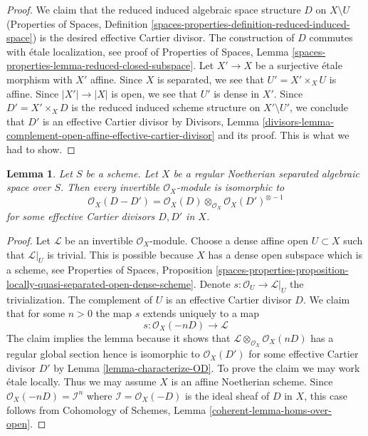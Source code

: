 \documentclass{stacks-project}
\theoremstyle{plain}
\newtheorem{lemma}[subsection]{Lemma}
\theoremstyle{definition}
\theoremstyle{remark}
\numberwithin{equation}{subsection}
\begin{document}
\begin{proof}
We claim that the reduced induced algebraic space structure $D$
on $X \setminus U$ (Properties of Spaces, Definition
\ref{spaces-properties-definition-reduced-induced-space})
is the desired effective Cartier divisor. The construction
of $D$ commutes with \'etale localization, see proof of
Properties of Spaces, Lemma
\ref{spaces-properties-lemma-reduced-closed-subspace}.
Let $X' \to X$ be a surjective \'etale morphism with $X'$ affine.
Since $X$ is separated, we see that $U' = X' \times_X U$ is
affine. Since $|X'| \to |X|$ is open, we see that $U'$
is dense in $X'$. Since $D' = X' \times_X D$ is the reduced induced
scheme structure on $X' \setminus U'$, we conclude that
$D'$ is an effective Cartier divisor by
Divisors, Lemma
\ref{divisors-lemma-complement-open-affine-effective-cartier-divisor}
and its proof. This is what we had to show.
\end{proof}

\begin{lemma}
\label{lemma-Noetherian-regular-separated-pic-effective-Cartier}
Let $S$ be a scheme. Let $X$ be a regular Noetherian separated algebraic space
over $S$. Then every invertible $\mathcal{O}_X$-module is isomorphic to
$$
\mathcal{O}_X(D - D') =
\mathcal{O}_X(D) \otimes_{\mathcal{O}_X} \mathcal{O}_X(D')^{\otimes -1}
$$
for some effective Cartier divisors $D, D'$ in $X$.
\end{lemma}

\begin{proof}
Let $\mathcal{L}$ be an invertible $\mathcal{O}_X$-module.
Choose a dense affine open $U \subset X$ such that
$\mathcal{L}|_U$ is trivial. This is possible because
$X$ has a dense open subspace which is a scheme, see
Properties of Spaces, Proposition
\ref{spaces-properties-proposition-locally-quasi-separated-open-dense-scheme}.
Denote $s : \mathcal{O}_U \to \mathcal{L}|_U$ the trivialization.
The complement of $U$ is an effective Cartier divisor
$D$. We claim that for some $n > 0$ the map $s$ extends uniquely to a map
$$
s : \mathcal{O}_X(-nD) \longrightarrow \mathcal{L}
$$
The claim implies the lemma because it shows that
$\mathcal{L} \otimes_{\mathcal{O}_X} \mathcal{O}_X(nD)$
has a regular global section hence is isomorphic to
$\mathcal{O}_X(D')$ for some effective Cartier divisor $D'$
by Lemma \ref{lemma-characterize-OD}.
To prove the claim we may work \'etale locally. Thus we may assume
$X$ is an affine Noetherian scheme. Since
$\mathcal{O}_X(-nD) = \mathcal{I}^n$ where $\mathcal{I} = \mathcal{O}_X(-D)$
is the ideal sheaf of $D$ in $X$, this case follows from
Cohomology of Schemes, Lemma \ref{coherent-lemma-homs-over-open}.
\end{proof}
\end{document}
